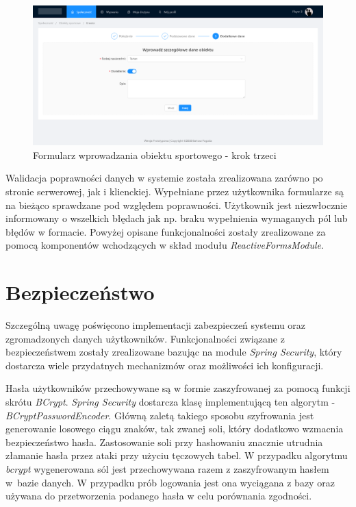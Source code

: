\begin{figure}[H]
\centering
\includegraphics[width=\linewidth]{06-implementacja/rys/form3.PNG}
\caption{Formularz wprowadzania obiektu sportowego - krok trzeci}
\label{fig:sample-form3}
\end{figure}

Walidacja poprawności danych w systemie została zrealizowana zarówno po stronie serwerowej, jak i klienckiej. Wypełniane przez użytkownika formularze są na bieżąco sprawdzane pod względem poprawności. Użytkownik jest niezwłocznie informowany o wszelkich błędach jak np. braku wypełnienia wymaganych pól lub błędów w formacie. Powyżej opisane funkcjonalności zostały zrealizowane za pomocą komponentów wchodzących w skład modułu \textit{ReactiveFormsModule}.


\section{Bezpieczeństwo}

Szczególną uwagę poświęcono implementacji zabezpieczeń systemu oraz zgromadzonych danych użytkowników. Funkcjonalności związane z bezpieczeństwem zostały zrealizowane bazując na module \textit{Spring Security}, który dostarcza wiele przydatnych mechanizmów oraz możliwości ich konfiguracji.

Hasła użytkowników przechowywane są w formie zaszyfrowanej za pomocą funkcji skrótu \textit{BCrypt}. \textit{Spring Security} dostarcza klasę implementującą ten algorytm - \textit{BCryptPasswordEncoder}. Główną zaletą takiego sposobu szyfrowania jest generowanie losowego ciągu znaków, tak zwanej soli, który dodatkowo wzmacnia bezpieczeństwo hasła. Zastosowanie soli przy hashowaniu znacznie utrudnia złamanie hasła przez ataki przy użyciu tęczowych tabel. W przypadku algorytmu \textit{bcrypt} wygenerowana sól jest przechowywana razem z zaszyfrowanym hasłem w~bazie danych. W przypadku prób logowania jest ona wyciągana z bazy oraz używana do przetworzenia podanego hasła w celu porównania zgodności.

